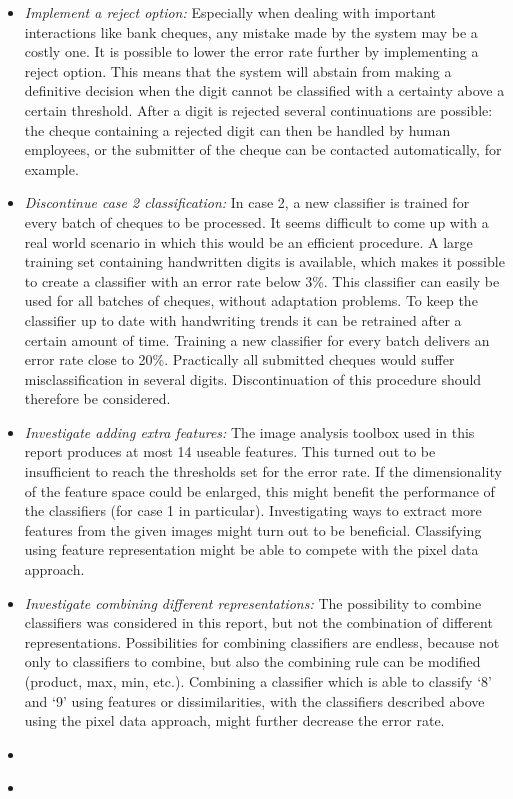 \begin{itemize}
	\item \textit{Implement a reject option:} Especially when dealing with important interactions like bank cheques, any mistake made by the system may be a costly one. It is possible to lower the error rate further by implementing a reject option. This means that the system will abstain from making a definitive decision when the digit cannot be classified with a certainty above a certain threshold. After a digit is rejected several continuations are possible: the cheque containing a rejected digit can then be handled by human employees, or the submitter of the cheque can be contacted automatically, for example.	
	\item \textit{Discontinue case 2 classification:} In case 2, a new classifier is trained for every batch of cheques to be processed. It seems difficult to come up with a real world scenario in which this would be an efficient procedure. A large training set containing handwritten digits is available, which makes it possible to create a classifier with an error rate below 3\%. This classifier can easily be used for all batches of cheques, without adaptation problems. To keep the classifier up to date with handwriting trends it can be retrained after a certain amount of time. 
	Training a new classifier for every batch delivers an error rate close to 20\%. Practically all submitted cheques would suffer misclassification in several digits. Discontinuation of this procedure should therefore be considered.
	
	\item \textit{Investigate adding extra features:} The image analysis toolbox used in this report produces at most 14 useable features. This turned out to be insufficient to reach the thresholds set for the error rate. If the dimensionality of the feature space could be enlarged, this might benefit the performance of the classifiers (for case 1 in particular). Investigating ways to extract more features from the given images might turn out to be beneficial. Classifying using feature representation might be able to compete with the pixel data approach.
	\item \textit{Investigate combining different representations:} The possibility to combine classifiers was considered in this report, but not the combination of different representations. Possibilities for combining classifiers are endless, because not only to classifiers to combine, but also the combining rule can be modified (product, max, min, etc.). Combining a classifier which is able to classify ‘8’ and ‘9’ using features or dissimilarities, with the classifiers described above using the pixel data approach, might further decrease the error rate. 
	\item \textit{}
	\item \textit{}
\end{itemize}